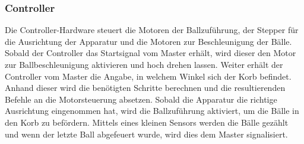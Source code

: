 \subsubsection{Controller}
	Die Controller-Hardware steuert die Motoren der Ballzuführung, der Stepper für die Ausrichtung der Apparatur und die Motoren zur Beschleunigung der Bälle. Sobald der Controller das Startsignal vom Master erhält, wird dieser den Motor zur Ballbeschleunigung aktivieren und hoch drehen lassen. Weiter erhält der Controller vom Master die Angabe, in welchem Winkel sich der Korb befindet. Anhand dieser wird die benötigten Schritte berechnen und die resultierenden Befehle an die Motorsteuerung absetzen. Sobald die Apparatur die richtige Ausrichtung eingenommen hat, wird die Ballzuführung aktiviert, um die Bälle in den Korb zu befördern. Mittels eines kleinen Sensors werden die Bälle gezählt und wenn der letzte Ball abgefeuert wurde, wird dies dem Master signalisiert.